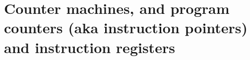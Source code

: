 
\chapter{Counter machines, and program counters (aka instruction pointers) and instruction registers}
